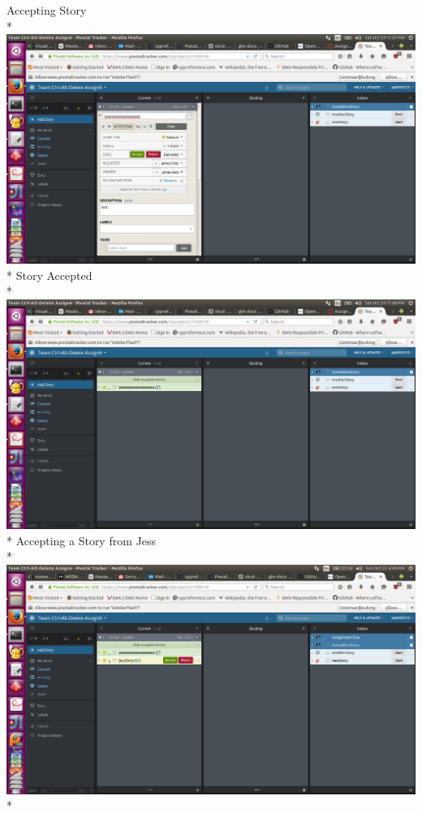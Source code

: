 \documentclass{article}
\begin{document}
\newpage Accepting Story\\*
\includegraphics[scale=.3]{Screenshot from 2015-10-24 23-07-44.png}\\*
Story Accepted\\*
\includegraphics[scale=.3]{Screenshot from 2015-10-24 23-08-16.png}\\*
\newpage Accepting a Story from Jess\\*
\includegraphics[scale=.3]{Screenshot from 2015-10-25 18-49-15.png}\\*
\end{document}

